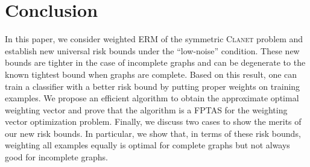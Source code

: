 \documentclass[letterpaper]{article} %
\newcommand{\probdistri}{\mathbf{p}}
\newcommand{\problemabbr}{\textnormal{C}\textsc{lanet}}
\newcommand{\normo}[1]{\|#1\|_1}
\begin{document}


\section{Conclusion} %
\label{sec:conclusion}
In this paper, we consider weighted ERM of the symmetric \problemabbr{} problem and establish new universal risk bounds under the ``low-noise'' condition. 
These new bounds are tighter in the case of incomplete graphs and can be degenerate to the known tightest bound when graphs are complete. 
Based on this result, one can train a classifier with a better risk bound by putting proper weights on training examples. 
We propose an efficient algorithm to obtain the approximate optimal weighting vector and prove that the algorithm is a FPTAS for the weighting vector optimization problem. 
Finally, we discuss two cases to show the merits of our new risk bounds.
In particular, we show that, in terms of these risk bounds, weighting all examples equally is optimal for complete graphs but not always good for incomplete graphs. 




\end{document}
